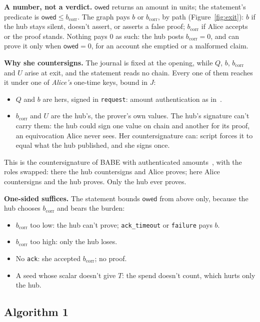 \documentclass[11pt]{article}
\theoremstyle{plain}
\theoremstyle{definition}
\newcommand{\bcorr}{b_{\mathrm{corr}}}
\newcommand{\tx}[1]{\texttt{#1}}
\newcommand{\owed}{\mathsf{owed}}
\begin{document}
\textbf{A number, not a verdict.} $\owed$ returns an amount in units;
the statement's predicate is $\owed \le \bcorr$. The graph pays $b$ or
$\bcorr$, by path (Figure~\ref{fig:exit}): $b$ if the hub stays silent,
doesn't assert, or asserts a false proof; $\bcorr$ if Alice accepts or
the proof stands. Nothing pays 0 as such: the hub posts $\bcorr = 0$,
and can prove it only when $\owed = 0$, for an account she emptied or a
malformed claim.

\textbf{Why she countersigns.} The journal is fixed at the opening,
while $Q$, $b$, $\bcorr$ and $U$ arise at exit, and the statement reads
no chain. Every one of them reaches it under one of \emph{Alice's}
one-time keys, bound in $J$:
\begin{itemize}[nosep]
\item $Q$ and $b$ are hers, signed in \tx{request}: amount
  authentication as in~\cite{lichen}.
\item $\bcorr$ and $U$ are the hub's, the prover's own values. The
  hub's signature can't carry them: the hub could sign one value on
  chain and another for its proof, an equivocation Alice never sees.
  Her countersignature can: script forces it to equal what the hub
  published, and she signs once.
\end{itemize}
This is the countersignature of BABE with authenticated
amounts~\cite{lichen,delving}, with the roles swapped: there the hub
countersigns and Alice proves; here Alice countersigns and the hub
proves. Only the hub ever proves.

\textbf{One-sided suffices.} The statement bounds $\owed$ from above
only, because the hub chooses $\bcorr$ and bears the burden:
\begin{itemize}[nosep]
\item $\bcorr$ too low: the hub can't prove; \tx{ack\_timeout} or
  \tx{failure} pays $b$.
\item $\bcorr$ too high: only the hub loses.
\item No \tx{ack}: she accepted $\bcorr$; no proof.
\item A seed whose scalar doesn't give $T$: the spend doesn't count,
  which hurts only the hub.
\end{itemize}

\subsection{Algorithm 1}\label{sec:algo}
\end{document}
